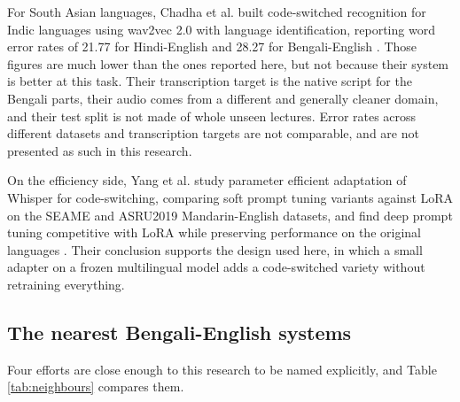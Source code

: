 For South Asian languages, Chadha et al. built code-switched recognition for Indic
languages using wav2vec 2.0 with language identification, reporting word error rates of
21.77 for Hindi-English and 28.27 for Bengali-English \cite{chadha2022indic}. Those
figures are much lower than the ones reported here, but not because their system is
better at this task. Their transcription target is the native script for the Bengali
parts, their audio comes from a different and generally cleaner domain, and their test
split is not made of whole unseen lectures. Error rates across different datasets and
transcription targets are not comparable, and are not presented as such in this research.

On the efficiency side, Yang et al. study parameter efficient adaptation of Whisper for
code-switching, comparing soft prompt tuning variants against LoRA on the SEAME and
ASRU2019 Mandarin-English datasets, and find deep prompt tuning competitive with LoRA
while preserving performance on the original languages \cite{yang2025spt}. Their
conclusion supports the design used here, in which a small adapter on a frozen
multilingual model adds a code-switched variety without retraining everything.

\subsection{The nearest Bengali-English systems}

Four efforts are close enough to this research to be named explicitly, and Table
\ref{tab:neighbours} compares them.

